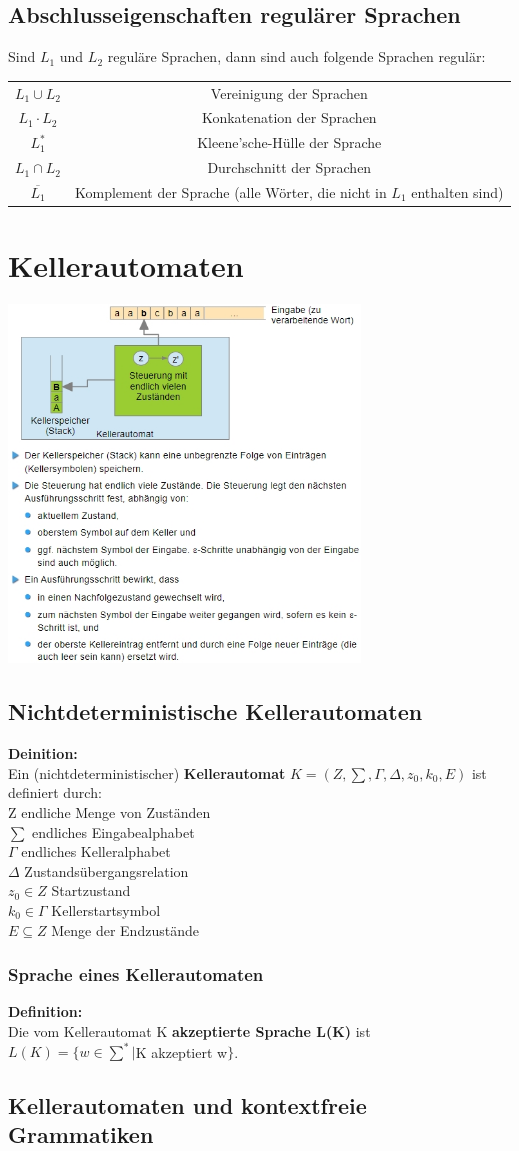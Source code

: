 \documentclass{scrreprt}
\newcommand\tab[1][1cm]{\hspace*{#1}}
\begin{document}
\section{Abschlusseigenschaften regulärer Sprachen}
Sind $L_1$ und $L_2$ reguläre Sprachen, dann sind auch folgende Sprachen regulär:
\\\begin{tabular}{ c c }
    $L_1 \cup L_2$ & Vereinigung der Sprachen \\ 
    $L_1 \cdot L_2$ & Konkatenation der Sprachen \\  
    $L_{1}^{*}$ & Kleene'sche-Hülle der Sprache \\
    $L_1 \cap L_2$ & Durchschnitt der Sprachen \\  
    $\overline{L_1}$ & Komplement der Sprache (alle Wörter, die nicht in $L_1$ enthalten sind)      
   \end{tabular}
\chapter{Kellerautomaten}
\includegraphics[width=0.7\textwidth]{"graphics/Kellerautomat-Aufbau"}
\section{Nichtdeterministische Kellerautomaten}
\textbf{Deinition:}
\\Ein (nichtdeterministischer) \textbf{Kellerautomat} $K=(Z,\sum,\Gamma,\Delta,z_0,k_0,E)$ ist definiert durch:
\\\tab Z \tab endliche Menge von Zuständen
\\\tab $\sum$ \tab endliches Eingabealphabet
\\\tab $\Gamma$ \tab endliches Kelleralphabet
\\\tab $\Delta$ \tab Zustandsübergangsrelation
\\\tab $z_0 \in Z$ \tab Startzustand
\\\tab $k_0 \in \Gamma$ \tab Kellerstartsymbol
\\\tab $E \subseteq Z$ \tab Menge der Endzustände
\subsection{Sprache eines Kellerautomaten}
\textbf{Definition:}
\\Die vom Kellerautomat K \textbf{akzeptierte Sprache L(K)} ist \\$L(K)=\{w \in \sum^{*}|$K akzeptiert w$\}$.
\section{Kellerautomaten und kontextfreie Grammatiken}
\end{document}
